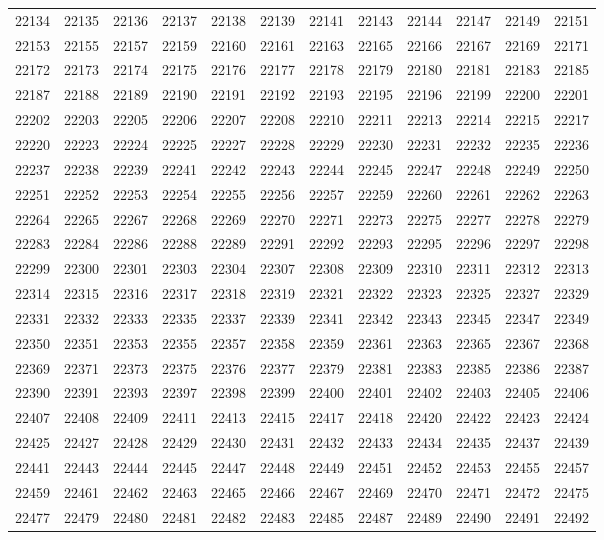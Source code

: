 \begin{center}
\begin{longtable}{llllllllllll}
22134 &22135 &22136 &22137 &22138 &22139 &22141 &22143 &22144 &22147 &22149 &22151 \\
22153 &22155 &22157 &22159 &22160 &22161 &22163 &22165 &22166 &22167 &22169 &22171 \\
22172 &22173 &22174 &22175 &22176 &22177 &22178 &22179 &22180 &22181 &22183 &22185 \\
22187 &22188 &22189 &22190 &22191 &22192 &22193 &22195 &22196 &22199 &22200 &22201 \\
22202 &22203 &22205 &22206 &22207 &22208 &22210 &22211 &22213 &22214 &22215 &22217 \\
22220 &22223 &22224 &22225 &22227 &22228 &22229 &22230 &22231 &22232 &22235 &22236 \\
22237 &22238 &22239 &22241 &22242 &22243 &22244 &22245 &22247 &22248 &22249 &22250 \\
22251 &22252 &22253 &22254 &22255 &22256 &22257 &22259 &22260 &22261 &22262 &22263 \\
22264 &22265 &22267 &22268 &22269 &22270 &22271 &22273 &22275 &22277 &22278 &22279 \\
22283 &22284 &22286 &22288 &22289 &22291 &22292 &22293 &22295 &22296 &22297 &22298 \\
22299 &22300 &22301 &22303 &22304 &22307 &22308 &22309 &22310 &22311 &22312 &22313 \\
22314 &22315 &22316 &22317 &22318 &22319 &22321 &22322 &22323 &22325 &22327 &22329 \\
22331 &22332 &22333 &22335 &22337 &22339 &22341 &22342 &22343 &22345 &22347 &22349 \\
22350 &22351 &22353 &22355 &22357 &22358 &22359 &22361 &22363 &22365 &22367 &22368 \\
22369 &22371 &22373 &22375 &22376 &22377 &22379 &22381 &22383 &22385 &22386 &22387 \\
22390 &22391 &22393 &22397 &22398 &22399 &22400 &22401 &22402 &22403 &22405 &22406 \\
22407 &22408 &22409 &22411 &22413 &22415 &22417 &22418 &22420 &22422 &22423 &22424 \\
22425 &22427 &22428 &22429 &22430 &22431 &22432 &22433 &22434 &22435 &22437 &22439 \\
22441 &22443 &22444 &22445 &22447 &22448 &22449 &22451 &22452 &22453 &22455 &22457 \\
22459 &22461 &22462 &22463 &22465 &22466 &22467 &22469 &22470 &22471 &22472 &22475 \\
22477 &22479 &22480 &22481 &22482 &22483 &22485 &22487 &22489 &22490 &22491 &22492 \\

\end{longtable}
\end{center}
